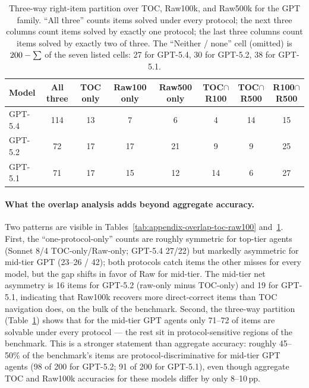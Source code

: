 \documentclass{article}
\begin{document}
\begin{table}[h]
\centering
\small
\setlength{\tabcolsep}{6pt}
\begin{tabular}{lccccccc}
\toprule
Model & All three & TOC only & Raw100 only & Raw500 only & TOC$\cap$R100 & TOC$\cap$R500 & R100$\cap$R500 \\
\midrule
GPT-5.4 & 114 & 13 & 7 & 6 & 4 & 14 & 15 \\
GPT-5.2 & 72 & 17 & 17 & 21 & 9 & 9 & 25 \\
GPT-5.1 & 71 & 17 & 15 & 12 & 14 & 6 & 27 \\
\bottomrule
\end{tabular}
\caption{Three-way right-item partition over TOC, Raw100k, and Raw500k for the GPT family. ``All three'' counts items solved under every protocol; the next three columns count items solved by exactly one protocol; the last three columns count items solved by exactly two of three. The ``Neither / none'' cell (omitted) is $200-\sum$ of the seven listed cells: 27 for GPT-5.4, 30 for GPT-5.2, 38 for GPT-5.1.}
\label{tab:appendix-overlap-three-way}
\end{table}

\paragraph{What the overlap analysis adds beyond aggregate accuracy.}
Two patterns are visible in Tables~\ref{tab:appendix-overlap-toc-raw100} and~\ref{tab:appendix-overlap-three-way}. First, the ``one-protocol-only'' counts are roughly symmetric for top-tier agents (Sonnet 8/4 TOC-only/Raw-only; GPT-5.4 27/22) but markedly asymmetric for mid-tier GPT (23--26 / 42); both protocols catch items the other misses for every model, but the gap shifts in favor of Raw for mid-tier. The mid-tier net asymmetry is 16 items for GPT-5.2 (raw-only minus TOC-only) and 19 for GPT-5.1, indicating that Raw100k recovers more direct-correct items than TOC navigation does, on the bulk of the benchmark. Second, the three-way partition (Table~\ref{tab:appendix-overlap-three-way}) shows that for the mid-tier GPT agents only 71--72 of \BenchN{} items are solvable under every protocol — the rest sit in protocol-sensitive regions of the benchmark. This is a stronger statement than aggregate accuracy: roughly 45--50\% of the benchmark's items are protocol-discriminative for mid-tier GPT agents (98 of 200 for GPT-5.2; 91 of 200 for GPT-5.1), even though aggregate TOC and Raw100k accuracies for these models differ by only 8--10\,pp.
\end{document}
